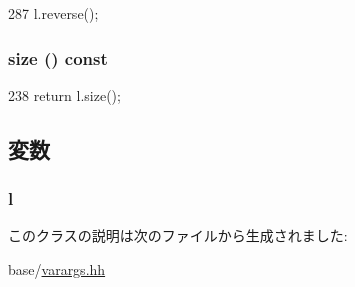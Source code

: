 \begin{DoxyCode}
287 { l.reverse(); }
\end{DoxyCode}
\hypertarget{classVarArgs_1_1List_a503ab01f6c0142145d3434f6924714e7}{
\subsubsection[{size}]{ size () const}}
\label{classVarArgs_1_1List_a503ab01f6c0142145d3434f6924714e7}



\begin{DoxyCode}
238 { return l.size(); }
\end{DoxyCode}


\subsection{変数}
\hypertarget{classVarArgs_1_1List_ae444945db5297bdd9e5c43355c9c76a1}{
\subsubsection[{l}]{ {\bf l}}}
\label{classVarArgs_1_1List_ae444945db5297bdd9e5c43355c9c76a1}


このクラスの説明は次のファイルから生成されました:\begin{DoxyCompactItemize}
\item 
base/\hyperlink{varargs_8hh}{varargs.hh}\end{DoxyCompactItemize}
